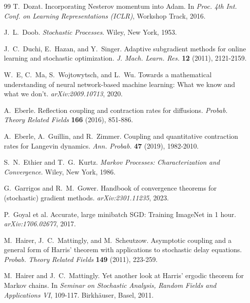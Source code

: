 \documentclass[11pt, a4paper,leqno]{amsart}
\theoremstyle{definition}
\numberwithin{equation}{section}
\begin{document}
\begin{thebibliography}{99}
T.~Dozat.
\newblock Incorporating Nesterov momentum into Adam.
\newblock In \emph{Proc. 4th Int. Conf. on Learning Representations (ICLR)}, Workshop Track, 2016.

J.~L.~Doob.
\newblock \emph{Stochastic Processes}.
\newblock Wiley, New York, 1953.



J.~C.~Duchi, E.~Hazan, and Y.~Singer.
\newblock Adaptive subgradient methods for online learning and stochastic optimization.
\newblock \emph{J. Mach. Learn. Res.} \textbf{12} (2011), 2121-2159.

W.~E, C.~Ma, S.~Wojtowytsch, and L.~Wu.
\newblock Towards a mathematical understanding of neural network-based machine learning: What we know and what we don't.
\newblock \emph{arXiv:2009.10713}, 2020.

A.~Eberle.
\newblock Reflection coupling and contraction rates for diffusions.
\newblock \emph{Probab. Theory Related Fields} \textbf{166} (2016), 851-886.

A.~Eberle, A.~Guillin, and R.~Zimmer.
\newblock Coupling and quantitative contraction rates for Langevin dynamics.
\newblock \emph{Ann. Probab.} \textbf{47} (2019), 1982-2010.

S.~N.~Ethier and T.~G.~Kurtz.
\newblock \emph{Markov Processes: Characterization and Convergence}.
\newblock Wiley, New York, 1986.

G.~Garrigos and R.~M.~Gower.
\newblock Handbook of convergence theorems for (stochastic) gradient methods.
\newblock \emph{arXiv:2301.11235}, 2023.

P.~Goyal et al.
\newblock Accurate, large minibatch SGD: Training ImageNet in 1 hour.
\newblock \emph{arXiv:1706.02677}, 2017.



M.~Hairer, J.~C.~Mattingly, and M.~Scheutzow.
\newblock Asymptotic coupling and a general form of Harris' theorem with applications to stochastic delay equations.
\newblock \emph{Probab. Theory Related Fields} \textbf{149} (2011), 223-259.

M.~Hairer and J.~C.~Mattingly.
\newblock Yet another look at Harris' ergodic theorem for Markov chains.
\newblock In \emph{Seminar on Stochastic Analysis, Random Fields and Applications VI}, 109-117.
\newblock Birkh\"auser, Basel, 2011.


\end{thebibliography}
\end{document}
